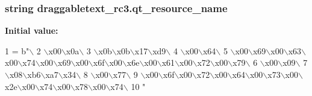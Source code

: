\subsubsection[{qt\+\_\+resource\+\_\+name}]{\setlength{\rightskip}{0pt plus 5cm}string draggabletext\+\_\+rc3.\+qt\+\_\+resource\+\_\+name}\label{namespacedraggabletext__rc3_ab06dad6dc8664eac17aee3a385fe69f4}
{\bfseries Initial value\+:}
\begin{DoxyCode}
1 = b\textcolor{stringliteral}{"\(\backslash\)}
2 \textcolor{stringliteral}{\(\backslash\)x00\(\backslash\)x0a\(\backslash\)}
3 \textcolor{stringliteral}{\(\backslash\)x0b\(\backslash\)x0b\(\backslash\)x17\(\backslash\)xd9\(\backslash\)}
4 \textcolor{stringliteral}{\(\backslash\)x00\(\backslash\)x64\(\backslash\)}
5 \textcolor{stringliteral}{\(\backslash\)x00\(\backslash\)x69\(\backslash\)x00\(\backslash\)x63\(\backslash\)x00\(\backslash\)x74\(\backslash\)x00\(\backslash\)x69\(\backslash\)x00\(\backslash\)x6f\(\backslash\)x00\(\backslash\)x6e\(\backslash\)x00\(\backslash\)x61\(\backslash\)x00\(\backslash\)x72\(\backslash\)x00\(\backslash\)x79\(\backslash\)}
6 \textcolor{stringliteral}{\(\backslash\)x00\(\backslash\)x09\(\backslash\)}
7 \textcolor{stringliteral}{\(\backslash\)x08\(\backslash\)xb6\(\backslash\)xa7\(\backslash\)x34\(\backslash\)}
8 \textcolor{stringliteral}{\(\backslash\)x00\(\backslash\)x77\(\backslash\)}
9 \textcolor{stringliteral}{\(\backslash\)x00\(\backslash\)x6f\(\backslash\)x00\(\backslash\)x72\(\backslash\)x00\(\backslash\)x64\(\backslash\)x00\(\backslash\)x73\(\backslash\)x00\(\backslash\)x2e\(\backslash\)x00\(\backslash\)x74\(\backslash\)x00\(\backslash\)x78\(\backslash\)x00\(\backslash\)x74\(\backslash\)}
10 \textcolor{stringliteral}{"}
\end{DoxyCode}
\hypertarget{namespacedraggabletext__rc3_a3332625f1b76a34da7b5055386e0ac03}{}
